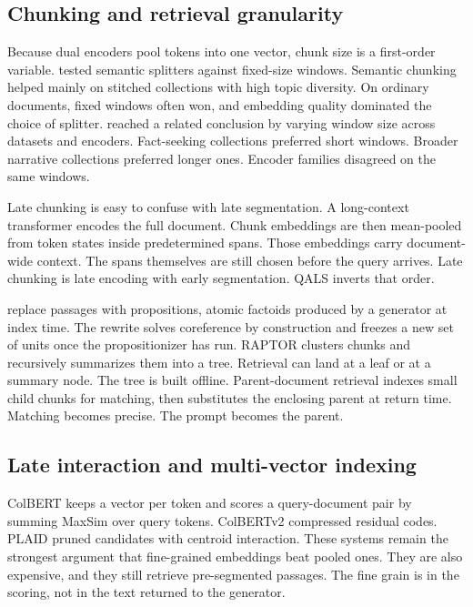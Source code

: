 \documentclass[preprint,12pt,authoryear]{elsarticle}
\begin{document}
\subsection{Chunking and retrieval granularity}
Because dual encoders pool tokens into one vector, chunk size is a first-order variable. \citet{qu2025semantic} tested semantic splitters against fixed-size windows. Semantic chunking helped mainly on stitched collections with high topic diversity. On ordinary documents, fixed windows often won, and embedding quality dominated the choice of splitter. \citet{bhat2025rethinking} reached a related conclusion by varying window size across datasets and encoders. Fact-seeking collections preferred short windows. Broader narrative collections preferred longer ones. Encoder families disagreed on the same windows.

Late chunking \citep{gunther2024late} is easy to confuse with late segmentation. A long-context transformer encodes the full document. Chunk embeddings are then mean-pooled from token states inside predetermined spans. Those embeddings carry document-wide context. The spans themselves are still chosen before the query arrives. Late chunking is late encoding with early segmentation. QALS inverts that order.

\citet{chen2024dense} replace passages with propositions, atomic factoids produced by a generator at index time. The rewrite solves coreference by construction and freezes a new set of units once the propositionizer has run. RAPTOR \citep{sarthi2024raptor} clusters chunks and recursively summarizes them into a tree. Retrieval can land at a leaf or at a summary node. The tree is built offline. Parent-document retrieval indexes small child chunks for matching, then substitutes the enclosing parent at return time. Matching becomes precise. The prompt becomes the parent.

\subsection{Late interaction and multi-vector indexing}
ColBERT \citep{khattab2020colbert} keeps a vector per token and scores a query-document pair by summing MaxSim over query tokens. ColBERTv2 \citep{santhanam2022colbertv2} compressed residual codes. PLAID \citep{santhanam2022plaid} pruned candidates with centroid interaction. These systems remain the strongest argument that fine-grained embeddings beat pooled ones. They are also expensive, and they still retrieve pre-segmented passages. The fine grain is in the scoring, not in the text returned to the generator.
\end{document}
